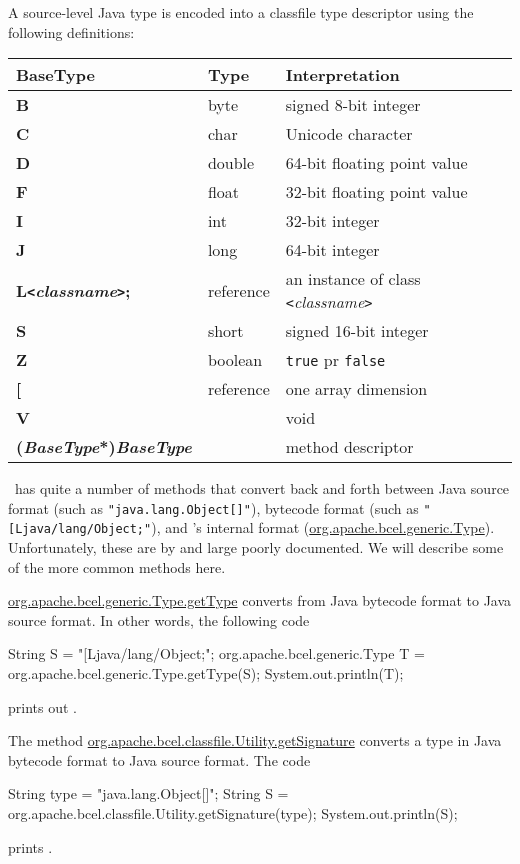 A source-level Java type is encoded into a classfile
type descriptor using the following definitions:
\begin{center}
\begin{tabular}{|l|l|l|}\hline
BaseType & Type & Interpretation \\\hline\hline
\bf B & byte & signed 8-bit integer \\\hline
\bf C & char & Unicode character\\\hline
\bf D & double & 64-bit floating point value \\\hline
\bf F & float & 32-bit floating point value\\\hline
\bf I & int &  32-bit integer \\\hline
\bf J & long & 64-bit integer\\\hline
\bf L{\tt <}{\em classname}{\tt >}; & reference & an instance of class {\tt <}{\em classname}{\tt >} \\\hline
\bf S & short & signed 16-bit integer\\\hline
\bf Z& boolean & {\tt true} pr {\tt false}\\\hline
\bf [ & reference & one array dimension\\\hline
\bf V &  & void\\\hline
\bf ({\em BaseType}*){\em BaseType} &  & method descriptor\\\hline
\end{tabular}
\end{center}

\BCEL\ has quite a number of methods that convert back
and forth between Java source format (such as {\tt "java.lang.Object[]"}),
bytecode format (such as {\tt "[Ljava/lang/Object;"}), and 
\BCEL's internal format (\url{org.apache.bcel.generic.Type}).
Unfortunately, these are by and large poorly documented.
We will describe some of the more common methods here.

\url{org.apache.bcel.generic.Type.getType} converts
from Java bytecode format to Java source format.
In other words, the following code
\begin{listing}{1}
    String S = "[Ljava/lang/Object;";
    org.apache.bcel.generic.Type T =
       org.apache.bcel.generic.Type.getType(S);
    System.out.println(T);
\end{listing}
prints out .

The method \url{org.apache.bcel.classfile.Utility.getSignature}
converts a type in Java bytecode format to Java source format.
The code
\begin{listing}{1}
    String type = "java.lang.Object[]";
    String S = org.apache.bcel.classfile.Utility.getSignature(type);
    System.out.println(S);
\end{listing}
prints \CC{[Ljava/lang/Object;}.

